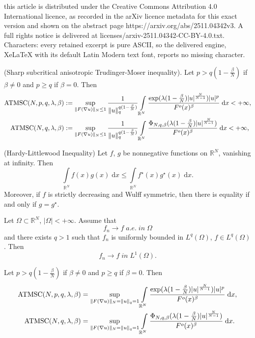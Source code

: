 \documentclass[10pt,a4paper]{amsart}
\newcommand{\R}{\mathbb{R}}
\begin{document}
this article is distributed under the Creative Commons Attribution 4.0 International licence, as recorded in the arXiv licence metadata for this exact version and shown on the abstract page https://arxiv.org/abs/2511.04342v3. A full rights notice is delivered at licenses/arxiv-2511.04342-CC-BY-4.0.txt. Characters: every retained excerpt is pure ASCII, so the delivered engine, XeLaTeX with its default Latin Modern text font, reports no missing character.
\begin{theoremalph}(Sharp subcritical anisotropic Trudinger-Moser inequality).\label{tha}
Let $p>q(1-\frac{\beta}{N})$ if $\beta\neq0$ and $p\geq q$ if $\beta=0$. Then
\begin{align}
    \mathrm{ATMSC}(N,p,q,\lambda,\beta)&:=\sup\limits_{\|F(\nabla u)\|_{N}\leq 1}\frac{1}{\|u\|_{q}^{q(1-\frac{\beta}{N})}}\int\limits_{\R^{N}}\frac{\exp(\lambda(1-\frac{\beta}{N})\lvert u\rvert^{\frac{N}{N-1}})\lvert u\rvert^{p}}{F^{o}(x)^{\beta}}\;\mathrm{d}x<+\infty,\notag\\
    \mathrm{ATMSC}(N,q,\lambda,\beta)&:=\sup\limits_{\|F(\nabla u)\|_{N}\leq 1}\frac{1}{\|u\|_{q}^{q(1-\frac{\beta}{N})}}\int\limits_{\R^{N}}\frac{\Phi_{N,q,\beta}(\lambda(1-\frac{\beta}{N})\lvert u\rvert^{\frac{N}{N-1}})}{F^{o}(x)^{\beta}}\;\mathrm{d}x<+\infty,\notag
\end{align}
\end{theoremalph}

\begin{lemma}\label{le2.3}(Hardy-Littlewood Inequality)
Let $f$, $g$ be nonnegative functions on $\R^{N}$, vanishing at infinity. Then
$$
\int\limits_{\R^{N}}f(x)g(x)\;\mathrm{d}x\leq \int\limits_{\R^{N}}f^{\star}(x)g^{\star}(x)\;\mathrm{d}x.
$$
Moreover, if $f$ is strictly decreasing and Wulff symmetric, then there is equality if and only if $g=g^{\star}$.
\end{lemma}

\begin{lemma}\label{le2.4}
Let $\Omega\subset\R^{N}$, $\lvert\Omega\rvert<+\infty$. Assume that
$$
f_{n}\rightarrow f\;a.e.\;in\;\Omega
$$
and there exists $q>1$ such that $f_{n}$ is uniformly bounded in $L^{q}(\Omega)$, $f\in L^{q}(\Omega)$. Then
$$
f_{n}\rightarrow f\;in\;L^{1}(\Omega).
$$
\end{lemma}

\begin{lemma}\label{le2.5}
Let $p>q(1-\frac{\beta}{N})$ if $\beta\neq0$ and $p\geq q$ if $\beta=0$. Then
\begin{align}
    \mathrm{ATMSC}(N,p,q,\lambda,\beta)&=\sup\limits_{\|F(\nabla u)\|_{N}=\|u\|_{q}=1}\int\limits_{\R^{N}}\frac{\exp(\lambda(1-\frac{\beta}{N})\lvert u\rvert^{\frac{N}{N-1}})\lvert u\rvert^{p}}{F^{o}(x)^{\beta}}\;\mathrm{d}x,\notag\\
    \mathrm{ATMSC}(N,q,\lambda,\beta)&=\sup\limits_{\|F(\nabla u)\|_{N}=\|u\|_{q}=1}\int\limits_{\R^{N}}\frac{\Phi_{N,q,\beta}(\lambda(1-\frac{\beta}{N})\lvert u\rvert^{\frac{N}{N-1}})}{F^{o}(x)^{\beta}}\;\mathrm{d}x.\notag
\end{align}
\end{lemma}
\end{document}
